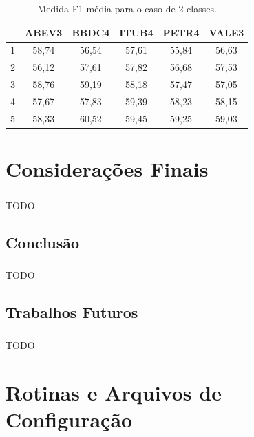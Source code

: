 \documentclass[grad,numbers]{coppe}
\begin{document}
	 			\begin{table}[h]
	 				\caption{Medida F1 média para o caso de 2 classes.}
	 				\label{tab:2c_f1_analysis}
	 				\centering
	 				{\footnotesize
	 					\begin{tabular}{|c|c|c|c|c|c|}
	 						\hline
	 						\diagbox[linewidth=0.2pt, width=\dimexpr \textwidth/10+2\tabcolsep\relax, height=0.8cm]{Dias}{Ativo}
	 						& ABEV3 & BBDC4 & ITUB4 & PETR4 & VALE3\\
	 						\hline
	 						1 & 58,74 & 56,54 & 57,61 & 55,84 & 56,63 \\
	 						2 & 56,12 & 57,61 & 57,82 & 56,68 & 57,53 \\
	 						3 & 58,76 & 59,19 & 58,18 & 57,47 & 57,05 \\
	 						4 & 57,67 & 57,83 & 59,39 & 58,23 & 58,15 \\
	 						5 & 58,33 & 60,52 & 59,45 & 59,25 & 59,03 \\
	 						\hline
	 				\end{tabular}}
	 			\end{table}
  
  \chapter{Considerações Finais}
  	\paragraph{}TODO
  	\section{Conclusão}
  		\paragraph{}TODO
 		\section{Trabalhos Futuros}
 			\paragraph{}TODO

  \backmatter
  
  

  \appendix	

	\chapter{Rotinas e Arquivos de Configuração}
\end{document}
